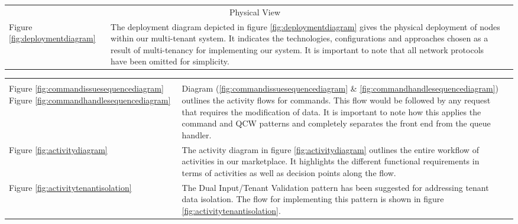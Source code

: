 \begin{table}[htp]
\centering
\begin{tabularx}{\textwidth}{lXl}
\cline{1-2}
\multicolumn{2}{|c|}{\cellcolor[HTML]{EFEFEF}Physical View} &  \\ \cline{1-2}
\multicolumn{1}{|l|}{Figure \ref{fig:deploymentdiagram}} & \multicolumn{1}{X|}{The deployment diagram depicted in figure \ref{fig:deploymentdiagram} gives the physical deployment of nodes within our multi-tenant system. It indicates the technologies, configurations and approaches chosen as a result of multi-tenancy for implementing our system. It is important to note that all network protocols have been omitted for simplicity.} &  \\ \cline{1-2}
\cline{1-2}
\end{tabularx}
\label{tab:physicalview}
\end{table}


\begin{table}[htp]
\centering
\begin{tabularx}{\textwidth}{lXl}
\cline{1-2}
\multicolumn{2}{|c|}{\cellcolor[HTML]{EFEFEF}{\color[HTML]{000000} Process View}} &  \\ \cline{1-2}
\multicolumn{1}{|l|}{
Figure \ref{fig:commandissuesequencediagram} Figure \ref{fig:commandhandlesequencediagram}} & \multicolumn{1}{X|}{Diagram (\ref{fig:commandissuesequencediagram} \& \ref{fig:commandhandlesequencediagram}) outlines the activity flows for commands. This flow would be followed by any request that requires the modification of data. It is important to note how this applies the command and QCW \index{Queue Centric Workflow} patterns and completely separates the front end from the queue handler.} &  \\ \cline{1-2}
\multicolumn{1}{|l|}{Figure \ref{fig:activitydiagram}} & \multicolumn{1}{X|}{The activity diagram in figure \ref{fig:activitydiagram} outlines the entire workflow of activities in our marketplace. It highlights the different functional requirements in terms of activities as well as decision points along the flow.} &  \\ \cline{1-2}
\multicolumn{1}{|l|}{Figure \ref{fig:activitytenantisolation}} & \multicolumn{1}{X|}{The Dual Input/Tenant Validation pattern has been suggested for addressing tenant data isolation. The flow for implementing this pattern is shown in figure \ref{fig:activitytenantisolation}.} &  \\ \cline{1-2}
\end{tabularx}
\label{tab:processview}
\end{table}

